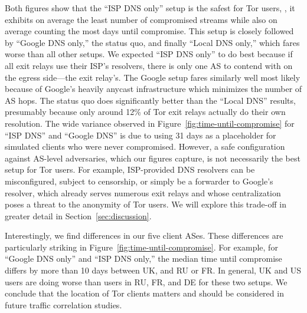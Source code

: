 Both figures show that the ``ISP DNS only'' setup is the safest for Tor users,
\ie, it exhibits on average the least number of compromised streams while also
on average counting the most days until compromise.  This setup is closely
followed by ``Google DNS only,'' the status quo, and finally ``Local DNS only,''
which fares worse than all other setups.  We expected ``ISP DNS only'' to do
best because if all exit relays use their ISP's resolvers, there is only one AS
to contend with on the egress side---the exit relay's.  The Google setup fares
similarly well most likely because of Google's heavily anycast infrastructure
which minimizes the number of AS hops.  The status quo does significantly better
than the ``Local DNS'' results, presumably because only around 12\% of Tor exit
relays actually do their own resolution.  The wide variance observed in
Figure~\ref{fig:time-until-compromise} for ``ISP DNS'' and ``Google DNS'' is due
to using 31 days as a placeholder for simulated clients who were never
compromised.  However, a safe configuration against AS-level adversaries, which
our figures capture, is not necessarily the best setup for Tor users.  For
example, ISP-provided DNS resolvers can be misconfigured, subject to censorship,
or simply be a forwarder to Google's resolver, which already serves numerous
exit relays and whose centralization poses a threat to the anonymity of Tor
users.  We will explore this trade-off in greater detail in
Section~\ref{sec:discussion}.

Interestingly, we find differences in our five client ASes.  These differences
are particularly striking in Figure~\ref{fig:time-until-compromise}.  For
example, for ``Google DNS only'' and ``ISP DNS only,''  the median time until
compromise differs by more than 10 days between UK, and RU or FR.  In general,
UK and US users are doing worse than users in RU, FR, and DE for these two
setups.  We conclude that the location of Tor clients matters and should be
considered in future traffic correlation studies.
